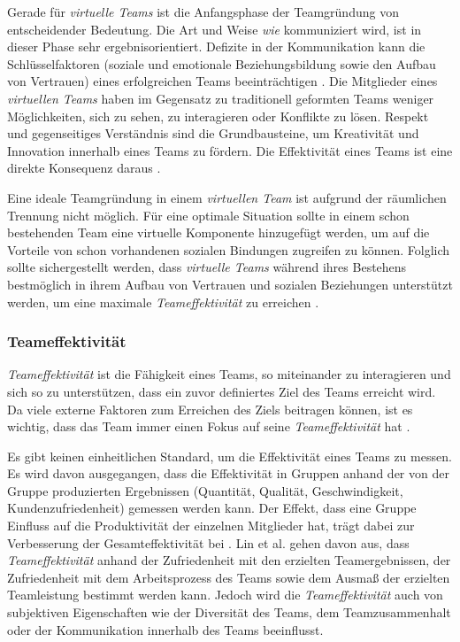 \documentclass[a4paper,11pt]{article}%
\renewcommand{\\}{\vspace*{0.5\baselineskip} \newline}
\begin{document}
Gerade für \textit{virtuelle Teams} ist die Anfangsphase der Teamgründung von entscheidender Bedeutung. 
Die Art und Weise \textit{wie} kommuniziert wird, ist in dieser Phase sehr ergebnisorientiert. Defizite in der Kommunikation kann die Schlüsselfaktoren (soziale und emotionale Beziehungsbildung sowie den Aufbau von Vertrauen) eines erfolgreichen Teams beeinträchtigen \citep[S. 378]{ren2007applying}.
Die Mitglieder eines \textit{virtuellen Teams} haben im Gegensatz zu traditionell geformten Teams weniger Möglichkeiten, sich zu sehen, zu interagieren oder Konflikte zu lösen. 
Respekt und gegenseitiges Verständnis sind die Grundbausteine, um Kreativität und Innovation innerhalb eines Teams zu fördern. Die Effektivität eines Teams ist eine direkte Konsequenz daraus \citep[S. 378]{ren2007applying}.

Eine ideale Teamgründung in einem \textit{virtuellen Team} ist aufgrund der räumlichen Trennung nicht möglich. 
Für eine optimale Situation sollte in einem schon bestehenden Team eine virtuelle Komponente hinzugefügt werden, um auf die Vorteile von schon vorhandenen sozialen Bindungen zugreifen zu können. Folglich sollte sichergestellt werden, dass \textit{virtuelle Teams} während ihres Bestehens bestmöglich in ihrem Aufbau von Vertrauen und sozialen Beziehungen unterstützt werden, um eine maximale \textit{Teameffektivität} zu erreichen \citep[S. 36-37]{holton2001building}.

\subsubsection{Teameffektivität}
\label{Teameffektivität}
\textit{Teameffektivität} ist die Fähigkeit eines Teams, so miteinander zu interagieren und sich so zu unterstützen, dass ein zuvor definiertes Ziel des Teams erreicht wird. Da viele externe Faktoren zum Erreichen des Ziels beitragen können, ist es wichtig, dass das Team immer einen Fokus auf seine \textit{Teameffektivität} hat \citep[S. 557]{salas2005there}.

Es gibt keinen einheitlichen Standard, um die Effektivität eines Teams zu messen. Es wird davon ausgegangen, dass die Effektivität in Gruppen anhand der von der Gruppe produzierten Ergebnissen (Quantität, Qualität, Geschwindigkeit, Kundenzufriedenheit) gemessen werden kann. Der Effekt, dass eine Gruppe Einfluss auf die Produktivität der einzelnen Mitglieder hat, trägt dabei zur Verbesserung der Gesamteffektivität bei \citep[S. 309]{guzzo1996teams}.
Lin et al. \citep{lin2008model} gehen davon aus, dass \textit{Teameffektivität} anhand der Zufriedenheit mit den erzielten Teamergebnissen, der Zufriedenheit mit dem Arbeitsprozess des Teams sowie dem Ausmaß der erzielten Teamleistung bestimmt werden kann.
Jedoch wird die \textit{Teameffektivität} auch von subjektiven Eigenschaften wie der Diversität des Teams, dem Teamzusammenhalt oder der Kommunikation innerhalb des Teams beeinflusst. 
\end{document}
